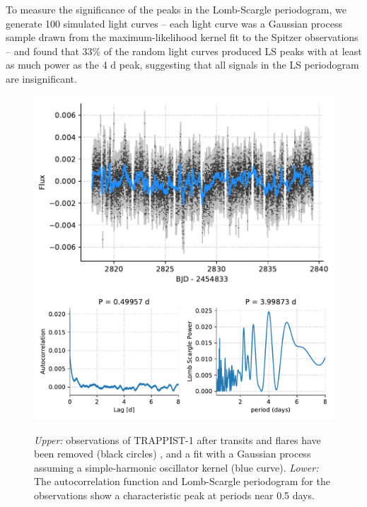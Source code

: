 To measure the significance of the peaks in the Lomb-Scargle periodogram, we generate 100 simulated light curves -- each light curve was a Gaussian process sample drawn from the maximum-likelihood kernel fit to the Spitzer observations -- and found that 33\% of the random light curves produced LS peaks with at least as much power as the 4 d peak, suggesting that all signals in the LS periodogram are insignificant.

\begin{figure}
\begin{center}
\includegraphics[scale=0.6]{trappist1_bright/gp.pdf}
\includegraphics[scale=0.5]{trappist1_bright/quasiperiodic.pdf}
\end{center}
\caption{\textsl{Upper:} \spitzer observations of TRAPPIST-1  after transits and flares have been removed (black circles) \citep{Delrez2018}, and a fit with a Gaussian process assuming a simple-harmonic oscillator kernel (blue curve). \textsl{Lower:} The autocorrelation function and Lomb-Scargle periodogram for the \spitzer observations show a characteristic peak at periods near 0.5 days. \label{fig:spitzer}}
\end{figure}

